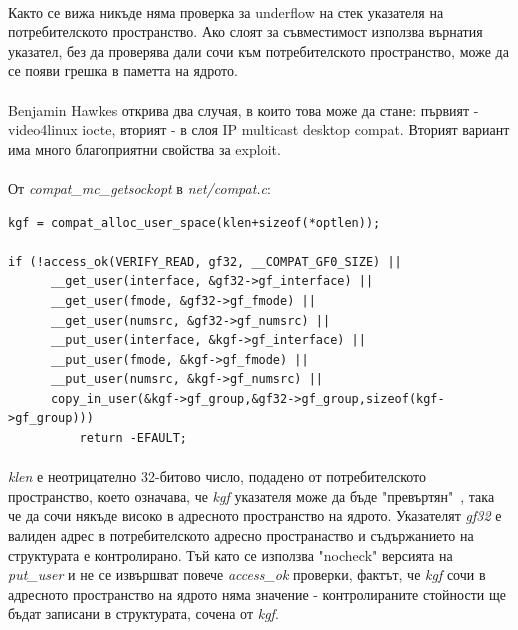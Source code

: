 \documentclass[a4paper,12pt,leqno]{article}
\begin{document}
\paragraph{}
Както се вижа никъде няма проверка за underflow на стек указателя на потребителското пространство. Ако слоят за съвместимост използва върнатия указател, без да проверява дали сочи към потребителското пространство, може да се появи грешка в паметта на ядрото.
\paragraph{}
Benjamin Hawkes открива два случая, в които това може да стане: първият - video4linux iocte, вторият - в слоя IP multicast desktop compat. Вторият вариант има много благоприятни свойства за exploit.
\paragraph{}
От \textit{compat\_mc\_getsockopt} в \textit{net/compat.c}:
\begin{verbatim}
kgf = compat_alloc_user_space(klen+sizeof(*optlen));                            
                                                                                
if (!access_ok(VERIFY_READ, gf32, __COMPAT_GF0_SIZE) ||                         
      __get_user(interface, &gf32->gf_interface) ||                             
      __get_user(fmode, &gf32->gf_fmode) ||                                     
      __get_user(numsrc, &gf32->gf_numsrc) ||                                   
      __put_user(interface, &kgf->gf_interface) ||                              
      __put_user(fmode, &kgf->gf_fmode) ||                                      
      __put_user(numsrc, &kgf->gf_numsrc) ||                                    
      copy_in_user(&kgf->gf_group,&gf32->gf_group,sizeof(kgf->gf_group)))       
          return -EFAULT;
\end{verbatim}
\paragraph{}
\textit{klen} е неотрицателно 32-битово число, подадено от потребителското пространство, което означава, че \textit{kgf} указателя може да бъде "превъртян"\ , така че да сочи някъде високо в адресното пространство на ядрото. Указателят \textit{gf32} е валиден адрес в потребителското адресно пространаство и съдържанието на структурата е контролирано. Тъй като се използва "nocheck" версията на \textit{put\_user} и не се извършват повече \textit{access\_ok} проверки, фактът, че \textit{kgf} сочи в адресното пространство на ядрото няма значение - контролираните стойности ще бъдат записани в структурата, сочена от \textit{kgf}.
\end{document}
